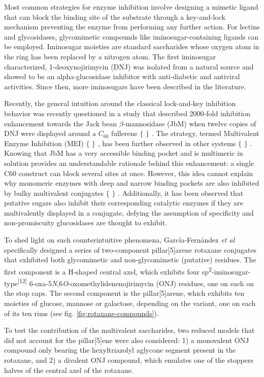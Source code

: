Most common strategies for enzyme inhibition involve designing a mimetic ligand that can block the binding site of the substrate through a key-and-lock mechanism preventing the enzyme from performing any further action. For lectins and glycosidases, glycomimetic compounds like iminosugar-containing ligands can be employed. Iminosugar moieties are standard saccharides whose oxygen atom in the ring has been replaced by a nitrogen atom. The first iminosugar characterized, 1-deoxynojirimycin (DNJ) was isolated from a natural source and showed to be an alpha-glucosidase inhibitor with anti-diabetic and antiviral activities. Since then, more iminosugars have been described in the literature.

Recently, the general intuition around the classical lock-and-key inhibition behavior was recently questioned in a study that described 2000-fold inhibition enhancement towards the Jack bean $\beta$-mannosidase (JbM) when twelve copies of DNJ were displayed around a $C_{60}$ fullerene $ \{ $ $ \} $ . The strategy, termed Multivalent Enzyme Inhibition (MEI) $ \{ $ $ \} $ , has been further observed in other systems $ \{ $ $ \} $ . Knowing that JbM has a very accessible binding pocket and is multimeric in solution provides an understandable rationale behind this enhancement: a single C60 construct can block several sites at once. However, this idea cannot explain why monomeric enzymes with deep and narrow binding pockets are also inhibited by bulky multivalent conjugates $ \{ $ $ \} $ . Additionally, it has been observed that putative sugars also inhibit their corresponding catalytic enzymes if they are multivalently displayed in a conjugate, defying the assumption of specificity and non-promiscuity glucosidases are thought to exhibit.

To shed light on such counterintuitive phenomena, García-Fernández \textit{et al }specifically designed a series of two-component pillar[5]arene rotaxane conjugates that exhibited both glycomimetic and non-glycomimetic (putative) residues. The first component is a H-shaped central axel, which exhibits four sp\textsuperscript{2}-iminosugar-type\textsuperscript{[12]} 6-oxa-5\textit{N},6\textit{O}-oxomethylidenenojirimycin (ONJ) residues, one on each on the stop caps. The second component is the pillar[5]arene, which exhibits ten moieties of glucose, mannose or galactose, depending on the variant, one on each of its ten rims (see fig. \ref{fig:rotaxane-compounds}).

To test the contribution of the multivalent saccharides, two reduced models that did not account for the pillar[5]ene were also considered: 1) a monovalent ONJ compound only bearing the hexyltriazolyl aglycone segment present in the rotaxane, and 2) a divalent ONJ compound, which emulates one of the stoppers halves of the central axel of the rotaxane.



